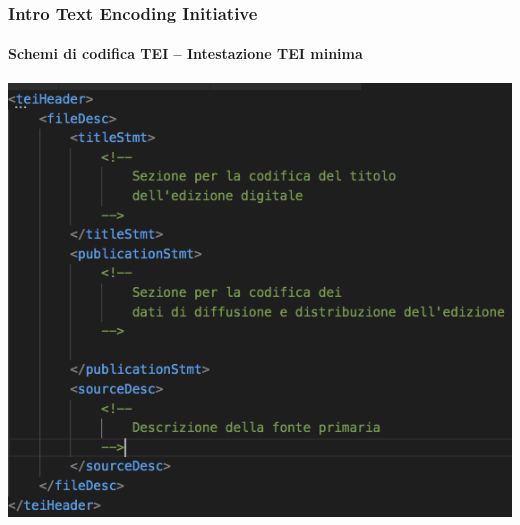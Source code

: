 \begin{frame}
	\frametitle{Intro Text Encoding Initiative}
	\framesubtitle{Schemi di codifica TEI – Intestazione TEI minima}
	\addtocounter{nframe}{1}

	\begin{center}
		\includegraphics[width=.8\textwidth]{imgs/tei-header.png}
    \end{center}

\end{frame}




